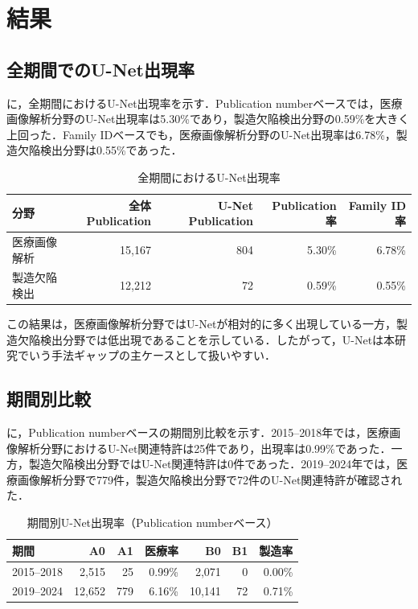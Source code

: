 \chapter{結果}

\section{全期間でのU-Net出現率}
に，全期間におけるU-Net出現率を示す．Publication numberベースでは，医療画像解析分野のU-Net出現率は5.30\%であり，製造欠陥検出分野の0.59\%を大きく上回った．Family IDベースでも，医療画像解析分野のU-Net出現率は6.78\%，製造欠陥検出分野は0.55\%であった．

\begin{table}[htbp]
  \centering
  \caption{全期間におけるU-Net出現率}
  \label{tab:unet_overall}
  \begin{tabular}{lrrrr}
    \toprule
    分野 & 全体Publication & U-Net Publication & Publication率 & Family ID率 \\
    \midrule
    医療画像解析 & 15,167 & 804 & 5.30\% & 6.78\% \\
    製造欠陥検出 & 12,212 & 72 & 0.59\% & 0.55\% \\
    \bottomrule
  \end{tabular}
\end{table}

この結果は，医療画像解析分野ではU-Netが相対的に多く出現している一方，製造欠陥検出分野では低出現であることを示している．したがって，U-Netは本研究でいう手法ギャップの主ケースとして扱いやすい．

\section{期間別比較}
に，Publication numberベースの期間別比較を示す．2015--2018年では，医療画像解析分野におけるU-Net関連特許は25件であり，出現率は0.99\%であった．一方，製造欠陥検出分野ではU-Net関連特許は0件であった．2019--2024年では，医療画像解析分野で779件，製造欠陥検出分野で72件のU-Net関連特許が確認された．

\begin{table}[htbp]
  \centering
  \caption{期間別U-Net出現率（Publication numberベース）}
  \label{tab:unet_period_publication}
  \begin{tabular}{lrrrrrr}
    \toprule
    期間 & A0 & A1 & 医療率 & B0 & B1 & 製造率 \\
    \midrule
    2015--2018 & 2,515 & 25 & 0.99\% & 2,071 & 0 & 0.00\% \\
    2019--2024 & 12,652 & 779 & 6.16\% & 10,141 & 72 & 0.71\% \\
    \bottomrule
  \end{tabular}
\end{table}

